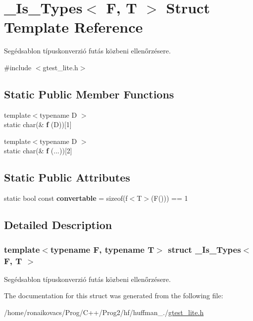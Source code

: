 \hypertarget{struct___is___types}{}\section{\+\_\+\+Is\+\_\+\+Types$<$ F, T $>$ Struct Template Reference}
\label{struct___is___types}


Segédsablon típuskonverzió futás közbeni ellenőrzésere.  




{\ttfamily \#include $<$gtest\+\_\+lite.\+h$>$}

\subsection*{Static Public Member Functions}
\begin{DoxyCompactItemize}
\item 
\mbox{\label{struct___is___types_a56e08a2768c571caab81e9bc47d5acc6}} 
{\footnotesize template$<$typename D $>$ }\\static char(\& {\bfseries f} (D))\mbox{[}1\mbox{]}
\item 
\mbox{\label{struct___is___types_a013da65c5a92e9bd02f5d361c10d376d}} 
{\footnotesize template$<$typename D $>$ }\\static char(\& {\bfseries f} (...))\mbox{[}2\mbox{]}
\end{DoxyCompactItemize}
\subsection*{Static Public Attributes}
\begin{DoxyCompactItemize}
\item 
\mbox{\label{struct___is___types_aef853f15f013611d0890cb6fc408ae47}} 
static bool const {\bfseries convertable} = sizeof(f$<$T$>$(F())) == 1
\end{DoxyCompactItemize}


\subsection{Detailed Description}
\subsubsection*{template$<$typename F, typename T$>$\newline
struct \+\_\+\+Is\+\_\+\+Types$<$ F, T $>$}

Segédsablon típuskonverzió futás közbeni ellenőrzésere. 

The documentation for this struct was generated from the following file\+:\begin{DoxyCompactItemize}
\item 
/home/ronaikovacs/\+Prog/\+C++/\+Prog2/hf/huffman\+\_./\hyperlink{gtest__lite_8h}{gtest\+\_\+lite.\+h}\end{DoxyCompactItemize}
